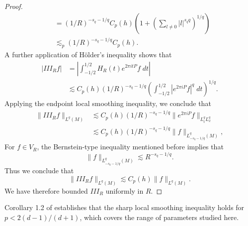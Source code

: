 \begin{proof}
\begin{align*}
        &= (1/R)^{-s_q - 1/q} C_p(h) \left( 1 + \left( \sum_{l \neq 0} |l|^{s_q q} \right)^{1/q} \right) \\
        &\lesssim_p (1/R)^{-s_q - 1/q} C_p(h).
    \end{align*}
    A further application of H\"{o}lder's inequality shows that
    \begin{align*}
        | III_R f | &= \left| \int_{-1/2}^{1/2} H_R(t) e^{2 \pi i t P} f\; dt \right|\\
        &\lesssim C_p(h) (1/R)^{-s_q - 1/q} \left( \int_{-1/2}^{1/2} |e^{2 \pi i P} f|^{q}\; dt \right)^{1/q}.
    \end{align*}
    Applying the endpoint local smoothing inequality, we conclude that
    \begin{align*}
        \| III_R f \|_{L^{q}(M)} &\lesssim C_p(h) (1/R)^{-s_q - 1/q} \| e^{2 \pi i P} f \|_{L^{q}_t L^{q}_x}\\
        &\lesssim C_p(h) (1/R)^{-s_q - 1/q} \| f \|_{L^{q}_{-s_q - 1/q}(M)},
    \end{align*}
    For $f \in V_R$, the Bernstein-type inequality mentioned before implies that
    \[ \| f \|_{L^{q}_{-s_q - 1/q}(M)} \lesssim R^{-s_q - 1/q}. \]
    Thus we conclude that
    \[ \| III_R f \|_{L^{q}(M)} \lesssim C_p(h) \| f \|_{L^{q}(M)}. \]
    We have therefore bounded $III_R$ uniformly in $R$.
\end{proof}

Corollary 1.2 of \cite{LeeSeeger} establishes that the sharp local smoothing inequality holds for $p < 2(d-1)/(d+1)$, which covers the range of parameters studied here.



